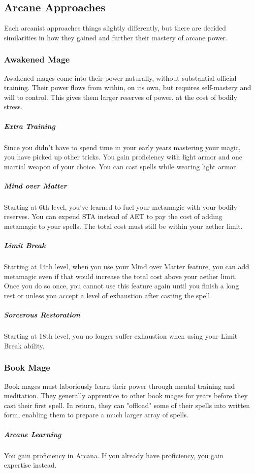 \subsection{Arcane Approaches}

Each arcanist approaches things slightly differently, but there are decided similarities in how they gained and further their mastery of arcane power.

\subsubsection{Awakened Mage}
Awakened mages come into their power naturally, without substantial official training. Their power flows from within, on its own, but requires self-mastery and will to control. This gives them larger reserves of power, at the cost of bodily stress. 

\subparagraph*{Extra Training}
Since you didn't have to spend time in your early years mastering your magic, you have picked up other tricks. You gain proficiency with light armor and one martial weapon of your choice. You can cast spells while wearing light armor.

\subparagraph*{Mind over Matter}
Starting at 6th level, you've learned to fuel your metamagic with your bodily reserves. You can expend STA instead of AET to pay the cost of adding metamagic to your spells. The total cost must still be within your aether limit.

\subparagraph*{Limit Break}
Starting at 14th level, when you use your Mind over Matter feature, you can add metamagic even if that would increase the total cost above your aether limit. Once you do so once, you cannot use this feature again until you finish a long rest or unless you accept a level of exhaustion after casting the spell.

\subparagraph*{Sorcerous Restoration}
Starting at 18th level, you no longer suffer exhaustion when using your Limit Break ability.

\subsubsection{Book Mage}
Book mages must laboriously learn their power through mental training and meditation. They generally apprentice to other book mages for years before they cast their first spell. In return, they can "offload" some of their spells into written form, enabling them to prepare a much larger array of spells.

\subparagraph*{Arcane Learning}
You gain proficiency in Arcana. If you already have proficiency, you gain expertise instead.

